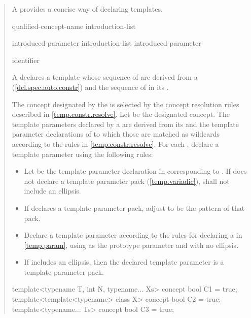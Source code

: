 \begin{quote}

\pnum
A  provides a concise way of declaring
templates.

\begin{bnf}
\br
   qualified-concept-name \terminal{\{} introduction-list \terminal{\}}

\br
  introduced-parameter\br
  introduction-list \terminal{,} introduced-parameter

\br
    \opt identifier
\end{bnf}

A  declares a template whose
sequence of  are derived from a
 (\ref{dcl.spec.auto.constr}) and the 
sequence of  in its 
.

\pnum
The concept designated by the  is selected 
by the concept resolution rules described in \ref{temp.constr.resolve}. Let
 be the designated concept.
% 
The template parameters declared by a 
are derived from its  and the
template parameter declarations of  to which those
 are matched as wildcards according to 
the rules in \ref{temp.constr.resolve}.
% 
For each  , declare a template
parameter using the following rules:
\begin{itemize}
\item Let  be the template parameter declaration in  
      corresponding to . If  does not declare a template 
      parameter pack (\ref{temp.variadic}),  shall not include 
      an ellipsis.

\item If  declares a template parameter pack, adjust  
      to be the pattern of that pack.

\item Declare a template parameter according to the rules for declaring a
       in \ref{temp.param}, using
       as the prototype parameter and with no ellipsis.

\item If  includes an ellipsis, then the declared template parameter 
      is a template parameter pack.
\end{itemize}
% 
\enterexample
\begin{codeblock}
template<typename T, int N, typename... Xs> concept bool C1 = true;
template<template<typename> class X> concept bool C2 = true;
template<typename... Ts> concept bool C3 = true;


\end{codeblock}
\end{quote}
